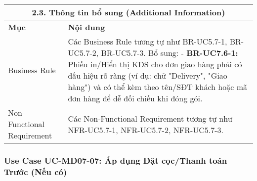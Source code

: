 \begin{longtable}{|m{4cm}|p{11cm}|}
\hline
\multicolumn{2}{|c|}{\textbf{2.3. Thông tin bổ sung (Additional Information)}} \\
\hline
\textbf{Mục} & \textbf{Nội dung} \\
\hline
Business Rule & Các Business Rule tương tự như BR-UC5.7-1, BR-UC5.7-2, BR-UC5.7-3. Bổ sung: \newline - \textbf{BR-UC7.6-1:} Phiếu in/Hiển thị KDS cho đơn giao hàng phải có dấu hiệu rõ ràng (ví dụ: chữ "Delivery", "Giao hàng") và có thể kèm theo tên/SĐT khách hoặc mã đơn hàng để dễ đối chiếu khi đóng gói. \\
\hline
Non-Functional Requirement & Các Non-Functional Requirement tương tự như NFR-UC5.7-1, NFR-UC5.7-2, NFR-UC5.7-3. \\
\hline
\end{longtable}

\subsubsection{Use Case UC-MD07-07: Áp dụng Đặt cọc/Thanh toán Trước (Nếu có)}


